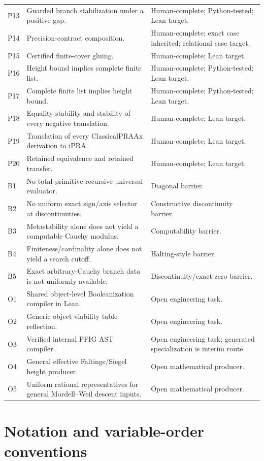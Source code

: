 \begin{longtable}{@{}>{\raggedright\arraybackslash}p{}>{\raggedright\arraybackslash}p{}>{\raggedright\arraybackslash}p{}@{}}
P13 & Guarded branch stabilization under a positive gap. & Human-complete; Python-tested; Lean target. \\
P14 & Precision-contract composition. & Human-complete; exact case inherited; relational case target. \\
P15 & Certified finite-cover gluing. & Human-complete; Lean target. \\
P16 & Height bound implies complete finite list. & Human-complete; Python-tested; Lean target. \\
P17 & Complete finite list implies height bound. & Human-complete; Python-tested; Lean target. \\
P18 & Equality stability and stability of every negative translation. & Human-complete; Lean target. \\
P19 & Translation of every ClassicalPRAAx derivation to iPRA. & Human-complete; Lean target. \\
P20 & Retained equivalence and retained transfer. & Human-complete; Lean target. \\
B1 & No total primitive-recursive universal evaluator. & Diagonal barrier. \\
B2 & No uniform exact sign/axis selector at discontinuities. & Constructive discontinuity barrier. \\
B3 & Metastability alone does not yield a computable Cauchy modulus. & Computability barrier. \\
B4 & Finiteness/cardinality alone does not yield a search cutoff. & Halting-style barrier. \\
B5 & Exact arbitrary-Cauchy branch data is not uniformly available. & Discontinuity/exact-zero barrier. \\
O1 & Shared object-level Booleanization compiler in Lean. & Open engineering task. \\
O2 & Generic object viability table reflection. & Open engineering task. \\
O3 & Verified internal PFIG AST compiler. & Open engineering task; generated specialization is interim route. \\
O4 & General effective Faltings/Siegel height producer. & Open mathematical producer. \\
O5 & Uniform rational representatives for general Mordell--Weil descent inputs. & Open mathematical producer. \\
\bottomrule
\end{longtable}
\normalsize

\section{Notation and variable-order conventions}

